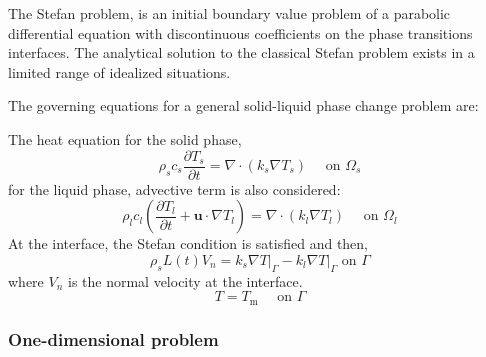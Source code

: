 \setlength{\parindent}{0.5cm} The Stefan problem, is an initial boundary value problem of a parabolic differential equation with discontinuous coefficients on the phase transitions interfaces. The analytical solution to the classical Stefan problem exists in a limited range of idealized situations.

\noindent The governing equations for a general solid-liquid phase change problem are:

\noindent The heat equation for the solid phase,
\begin{equation}
\rho_{s} c_{s} \frac{\partial T_{s}}{\partial t}=\nabla \cdot\left(k_{s} \nabla T_{s}\right) \quad \text { on } \Omega_{s}
\label{3.42}
\end{equation}
for the liquid phase, advective term is also considered:
\begin{equation}
\rho_{l} c_{l}\left(\frac{\partial T_{l}}{\partial t}+\mathbf{u} \cdot \nabla T_{l}\right)=\nabla \cdot\left(k_{l} \nabla T_{l}\right) \quad \text { on } \Omega_{l}
\label{3.43}
\end{equation}
At the interface, the Stefan condition is satisfied and then,
\begin{equation}
\rho_{s} L(t) V_{n}=\left.k_{s} \nabla T\right|_{\Gamma}-\left.k_{l} \nabla T\right|_{\Gamma} \text { on } \Gamma
\label{3.44}
\end{equation}
where $V_{n}$ is the normal velocity at the interface.
\begin{equation}
T=T_{\mathrm{m}} \quad \text { on } \Gamma
\end{equation}
\subsubsection*{One-dimensional problem}

